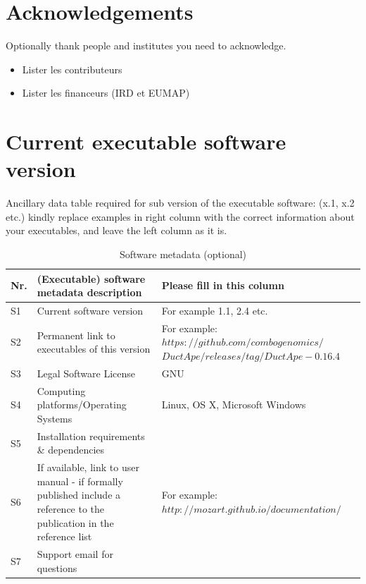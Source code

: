 \documentclass[12pt, a4paper,preprint,review]{elsarticle}
\newcommand{\comment}[1]
{\par {\bfseries \color{blue} #1 \par}} %
\begin{document}
\section*{Acknowledgements}
\label{}

Optionally thank people and institutes you need to acknowledge. 

\comment{
    \begin{itemize}
    \item Lister les contributeurs
    \item Lister les financeurs (IRD et EUMAP) 
    \end{itemize}
} 





\cite{depetris_mathieu_2022_3878124}
\cite{2018_r_core_team}


 



\section*{Current executable software version}
\label{}

Ancillary data table required for sub version of the executable software: (x.1, x.2 etc.) kindly replace examples in right column with the correct information about your executables, and leave the left column as it is.

\begin{table}[!h]
\begin{tabular}{|l|p{6.5cm}|p{6.5cm}|}
\hline
\textbf{Nr.} & \textbf{(Executable) software metadata description} & \textbf{Please fill in this column} \\
\hline
S1 & Current software version & For example 1.1, 2.4 etc. \\
\hline
S2 & Permanent link to executables of this version  & For example: $https://github.com/combogenomics/$ $DuctApe/releases/tag/DuctApe-0.16.4$ \\
\hline
S3 & Legal Software License & GNU  \\
\hline
S4 & Computing platforms/Operating Systems & Linux, OS X, Microsoft Windows \\
\hline
S5 & Installation requirements \& dependencies & \\
\hline
S6 & If available, link to user manual - if formally published include a reference to the publication in the reference list & For example: $http://mozart.github.io/documentation/$ \\
\hline
S7 & Support email for questions & \\
\hline
\end{tabular}
\caption{Software metadata (optional)}
\label{} 
\end{table}
\end{document}
